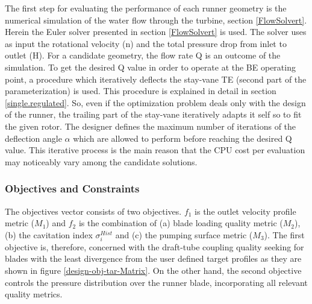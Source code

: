 The first step for evaluating the performance of each runner geometry is the numerical simulation of the water flow through the turbine, section \ref{FlowSolvert}. Herein the Euler solver presented in section \ref{FlowSolvert} is used.  The solver uses as input the rotational velocity (n) and the total pressure drop from inlet to outlet (H). For a candidate geometry, the flow rate Q is an outcome of the simulation. To get the desired Q value in order to operate at the BE operating point, a procedure which iteratively deflects the stay-vane TE (second part of the parameterization) is used. This procedure is explained in detail in section \ref{single.regulated}. So, even if the optimization problem deals only with the design of the runner, the trailing part of the stay-vane iteratively adapts it self so to fit the given rotor. The designer defines the maximum number of iterations of the deflection angle $\alpha$ which are allowed to perform before reaching the desired Q value. This iterative process is the main reason that the CPU cost per evaluation may noticeably vary among the candidate solutions.




\subsubsection{Objectives and Constraints}

The objectives vector consists of two objectives. $f_1$ is the outlet velocity profile metric ($M_1$) and $f_2$ is the combination of (a) blade loading quality metric ($M_2$), (b) the cavitation index $\sigma_i^{Hist}$ and (c) the pumping surface metric ($M_3$). The first objective is, therefore, concerned with the draft-tube coupling quality seeking for blades with the least divergence from the user defined target profiles as they are shown in figure \ref{design-obj-tar-Matrix}. On the other hand, the second objective controls the pressure distribution over the runner blade, incorporating all relevant quality metrics.

